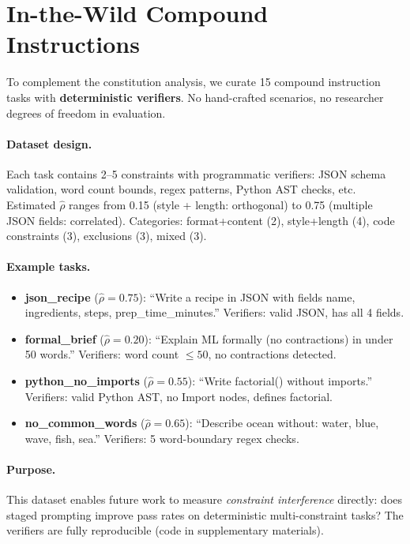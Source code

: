 \documentclass{article}
\theoremstyle{plain}
\theoremstyle{definition}
\theoremstyle{remark}
\newcommand{\rhohat}{\hat{\rho}}
\begin{document}
\section{In-the-Wild Compound Instructions}\label{app:compound}

To complement the constitution analysis, we curate 15 compound instruction tasks with \textbf{deterministic verifiers}. No hand-crafted scenarios, no researcher degrees of freedom in evaluation.

\paragraph{Dataset design.}
Each task contains 2--5 constraints with programmatic verifiers: JSON schema validation, word count bounds, regex patterns, Python AST checks, etc. Estimated $\rhohat$ ranges from 0.15 (style + length: orthogonal) to 0.75 (multiple JSON fields: correlated). Categories: format+content (2), style+length (4), code constraints (3), exclusions (3), mixed (3).

\paragraph{Example tasks.}
\begin{itemize}[nosep]
\item \textbf{json\_recipe} ($\rhohat{=}0.75$): ``Write a recipe in JSON with fields name, ingredients, steps, prep\_time\_minutes.'' Verifiers: valid JSON, has all 4 fields.
\item \textbf{formal\_brief} ($\rhohat{=}0.20$): ``Explain ML formally (no contractions) in under 50 words.'' Verifiers: word count $\le 50$, no contractions detected.
\item \textbf{python\_no\_imports} ($\rhohat{=}0.55$): ``Write factorial() without imports.'' Verifiers: valid Python AST, no Import nodes, defines factorial.
\item \textbf{no\_common\_words} ($\rhohat{=}0.65$): ``Describe ocean without: water, blue, wave, fish, sea.'' Verifiers: 5 word-boundary regex checks.
\end{itemize}

\paragraph{Purpose.} This dataset enables future work to measure \emph{constraint interference} directly: does staged prompting improve pass rates on deterministic multi-constraint tasks? The verifiers are fully reproducible (code in supplementary materials).
\end{document}
